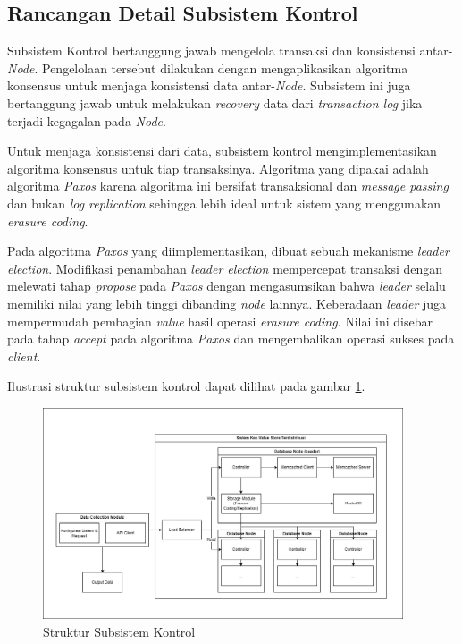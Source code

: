 \subsection{Rancangan Detail Subsistem Kontrol}
\label{subsection:detail-subsistem-kontrol}
  
Subsistem Kontrol bertanggung jawab mengelola transaksi dan konsistensi antar-\textit{Node}. Pengelolaan tersebut dilakukan dengan mengaplikasikan algoritma konsensus untuk menjaga konsistensi data antar-\textit{Node}. Subsistem ini juga bertanggung jawab untuk melakukan \textit{recovery} data dari \textit{transaction log} jika terjadi kegagalan pada \textit{Node}.

Untuk menjaga konsistensi dari data, subsistem kontrol mengimplementasikan algoritma konsensus untuk tiap transaksinya. Algoritma yang dipakai adalah algoritma \textit{Paxos} karena algoritma ini bersifat transaksional dan \textit{message passing} dan bukan \textit{log replication} sehingga lebih ideal untuk sistem yang menggunakan \textit{erasure coding}.

Pada algoritma \textit{Paxos} yang diimplementasikan, dibuat sebuah mekanisme \textit{leader election}. Modifikasi penambahan \textit{leader election} mempercepat transaksi dengan melewati tahap \textit{propose} pada \textit{Paxos} dengan mengasumsikan bahwa \textit{leader} selalu memiliki nilai yang lebih tinggi dibanding \textit{node} lainnya. Keberadaan \textit{leader} juga mempermudah pembagian \textit{value} hasil operasi \textit{erasure coding}. Nilai ini disebar pada tahap \textit{accept} pada algoritma \textit{Paxos} dan mengembalikan operasi sukses pada \textit{client}.



Ilustrasi struktur subsistem kontrol dapat dilihat pada gambar \ref{fig:control-subsystem-structure}.

\begin{figure}[ht]
    \centering
    \includegraphics[width=0.95\textwidth]{resources/chapter-3/general-architecture.png}
    \caption{Struktur Subsistem Kontrol}
    \label{fig:control-subsystem-structure}
\end{figure}